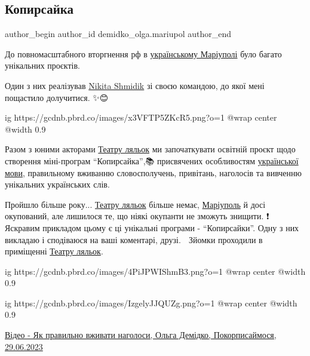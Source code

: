  
 
 
 
 

\subsection{Копирсайка}
\label{sec:29_06_2023.fb.demidko_olga.mariupol.1.kopirsajka}

\ifcmt
 author_begin
   author_id demidko_olga.mariupol
 author_end
\fi

До повномасштабного вторгнення рф в \href{\urlMariupolMyrnyyIA}{українському
Маріуполі} було багато унікальних проєктів.  

Один з них реалізував \href{https://www.facebook.com/nikita.shmidik}{Nikita
Shmidik} зі своєю командою, до якої мені пощастило долучитися. ✨️😊

\ifcmt
  ig https://gcdnb.pbrd.co/images/x3VFTP5ZKcR5.png?o=1
  @wrap center
  @width 0.9
\fi

Разом з юними акторами \href{\urlTeatrKukolMariupolIA}{Театру ляльок} ми започаткувати  освітній проєкт щодо
створення міні-програм \enquote{Копирсайка},📚 присвячених особливостям \href{\urlUkrainskaMovaIA}{української
мови}, правильному вживанню словосполучень, привітань, наголосів та вивченню
унікальних українських слів. 

Пройшло більше року... \href{\urlTeatrKukolMariupolIA}{Театру ляльок} більше немає, \href{\urlMariupolIA}{Маріуполь} й досі окупований,
але лишилося те, що ніякі окупанти не зможуть знищити. ❗️ Яскравим прикладом
цьому є ці унікальні програми - \enquote{Копирсайки}. Одну з них викладаю і сподіваюся
на ваші коментарі, друзі. 🙏 Зйомки проходили в приміщенні \href{\urlTeatrKukolMariupolIA}{Театру ляльок}.

\ifcmt
  ig https://gcdnb.pbrd.co/images/4PiJPWIShmB3.png?o=1
  @wrap center
  @width 0.9
\fi

\ifcmt
  ig https://gcdnb.pbrd.co/images/IzgelyJJQUZg.png?o=1
  @wrap center
  @width 0.9
\fi

\href{https://archive.org/details/video.29_06_2023.demidko_olga.pokorpysajmosja.jak_pravylno_vzhyvaty_nagolosy}{%
Відео - Як правильно вживати наголоси, Ольга Демідко, Покорписаймося, 29.06.2023%
}


